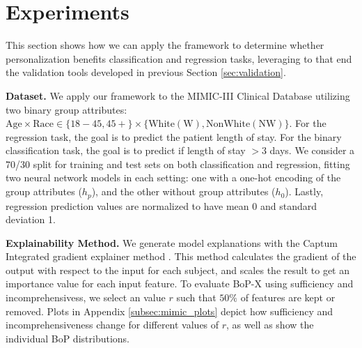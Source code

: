 \section{Experiments}\label{sec:results}

This section shows how we can apply the framework to determine whether personalization benefits classification and regression tasks, leveraging to that end the validation tools developed in previous Section \ref{sec:validation}. 

\textbf{Dataset.} We apply our framework to the MIMIC-III Clinical Database \citep{mimic-3} utilizing two binary group attributes: $\mathrm{Age} \times \mathrm{Race}  \in \{\mathrm{\mathrm{18-45}}, \mathrm{45+}\} \times \{\mathrm{White (W)}, \mathrm{NonWhite (NW)}\}$. For the regression task, the goal is to predict the patient length of stay. For the binary classification task, the goal is to predict if length of stay $> 3$ days. We consider a 70/30 split for training and test sets on both classification and regression, fitting two neural network models in each setting: one with a one-hot encoding of the group attributes ($h_p$), and the other without group attributes ($h_0$). Lastly, regression prediction values are normalized to have mean 0 and standard deviation 1.


\textbf{Explainability Method.} We generate model explanations with the Captum Integrated gradient explainer method \citep{sundararajan2017axiomaticattributiondeepnetworks}. This method calculates the gradient of the output with respect to the input for each subject, and scales the result to get an importance value for each input feature. To evaluate BoP-X using sufficiency and incomprehensivess, we select an value $r$ such that $50\%$ of features are kept or removed. Plots in Appendix \ref{subsec:mimic_plots} depict how sufficiency and incomprehensiveness change for different values of $r$, as well as show the individual BoP distributions.

